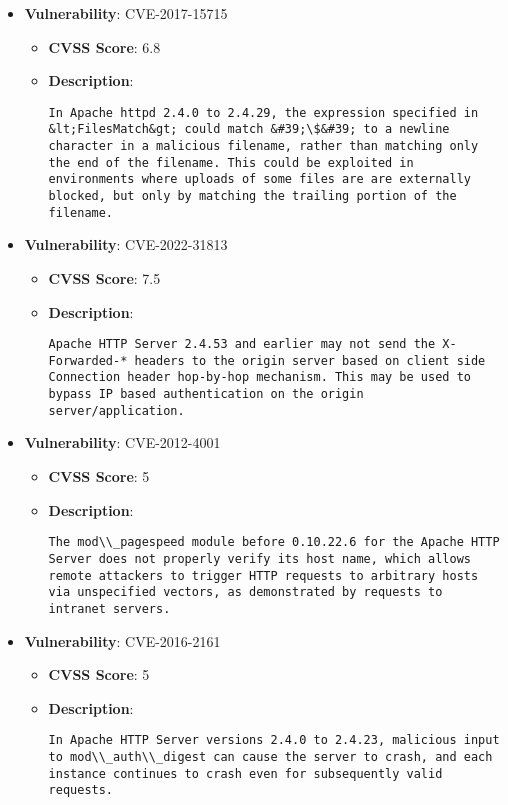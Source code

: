 \documentclass{article}
\begin{document}
\begin{itemize}
        \item \textbf{Vulnerability}: CVE-2017-15715
        \begin{itemize}
            \item \textbf{CVSS Score}:  6.8 
            \item \textbf{Description}:
            \parbox[t]{0.9\linewidth}{
                \verb|In Apache httpd 2.4.0 to 2.4.29, the expression specified in &lt;FilesMatch&gt; could match &#39;\$&#39; to a newline character in a malicious filename, rather than matching only the end of the filename. This could be exploited in environments where uploads of some files are are externally blocked, but only by matching the trailing portion of the filename.|
            }
        \end{itemize}
    
        \item \textbf{Vulnerability}: CVE-2022-31813
        \begin{itemize}
            \item \textbf{CVSS Score}:  7.5 
            \item \textbf{Description}:
            \parbox[t]{0.9\linewidth}{
                \verb|Apache HTTP Server 2.4.53 and earlier may not send the X-Forwarded-* headers to the origin server based on client side Connection header hop-by-hop mechanism. This may be used to bypass IP based authentication on the origin server/application.|
            }
        \end{itemize}
    
        \item \textbf{Vulnerability}: CVE-2012-4001
        \begin{itemize}
            \item \textbf{CVSS Score}:  5 
            \item \textbf{Description}:
            \parbox[t]{0.9\linewidth}{
                \verb|The mod\\_pagespeed module before 0.10.22.6 for the Apache HTTP Server does not properly verify its host name, which allows remote attackers to trigger HTTP requests to arbitrary hosts via unspecified vectors, as demonstrated by requests to intranet servers.|
            }
        \end{itemize}
    
        \item \textbf{Vulnerability}: CVE-2016-2161
        \begin{itemize}
            \item \textbf{CVSS Score}:  5 
            \item \textbf{Description}:
            \parbox[t]{0.9\linewidth}{
                \verb|In Apache HTTP Server versions 2.4.0 to 2.4.23, malicious input to mod\\_auth\\_digest can cause the server to crash, and each instance continues to crash even for subsequently valid requests.|
            }
        \end{itemize}
    

\end{itemize}
\end{document}
